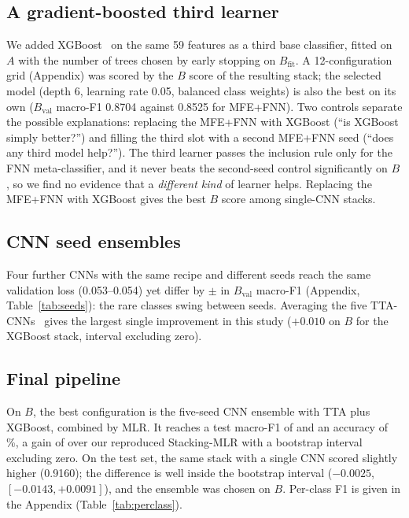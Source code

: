 \documentclass[conference]{IEEEtran}
\newcommand{\Bfit}{B_{\mathrm{fit}}}
\newcommand{\Bval}{B_{\mathrm{val}}}
\begin{document}
\subsection{A gradient-boosted third learner}
We added XGBoost~\cite{chen2016xgboost} on the same 59 features as a third base classifier, fitted on $A$ with the number
of trees chosen by early stopping on $\Bfit$. A 12-configuration grid (Appendix) was scored by the $B$ score of the
resulting stack; the selected model (depth 6, learning rate 0.05, balanced class weights) is also the best on its own
($\Bval$ macro-F1 0.8704 against 0.8525 for MFE+FNN). Two controls separate the possible explanations: replacing the
MFE+FNN with XGBoost (``is XGBoost simply better?'') and filling the third slot with a second MFE+FNN seed (``does any
third model help?''). The third learner passes the inclusion rule only for the FNN meta-classifier, and it never beats
the second-seed control significantly on $B$, so we find no evidence that a \emph{different kind} of learner helps.
Replacing the MFE+FNN with XGBoost gives the best $B$ score among single-CNN stacks.

\subsection{CNN seed ensembles}
Four further CNNs with the same recipe and different seeds reach the same validation loss (0.053--0.054) yet differ by
$\pm$\SeedStd{} in $\Bval$ macro-F1 (Appendix, Table~\ref{tab:seeds}): the rare classes swing between seeds. Averaging the
five TTA-CNNs~\cite{lakshminarayanan2017ensembles} gives the largest single improvement in this study ($+0.010$ on $B$
for the XGBoost stack, interval excluding zero).

\subsection{Final pipeline}
On $B$, the best configuration is the five-seed CNN ensemble with TTA plus XGBoost, combined by MLR. It reaches a test
macro-F1 of \FinalMacro{} and an accuracy of \FinalAcc\%, a gain of \GainOverRepro{} over our reproduced Stacking-MLR with a
bootstrap interval excluding zero. On the test set, the same stack with a single CNN scored slightly higher (0.9160); the
difference is well inside the bootstrap interval ($-0.0025$, $[-0.0143, +0.0091]$), and the ensemble was chosen on $B$.
Per-class F1 is given in the Appendix (Table~\ref{tab:perclass}).
\end{document}
